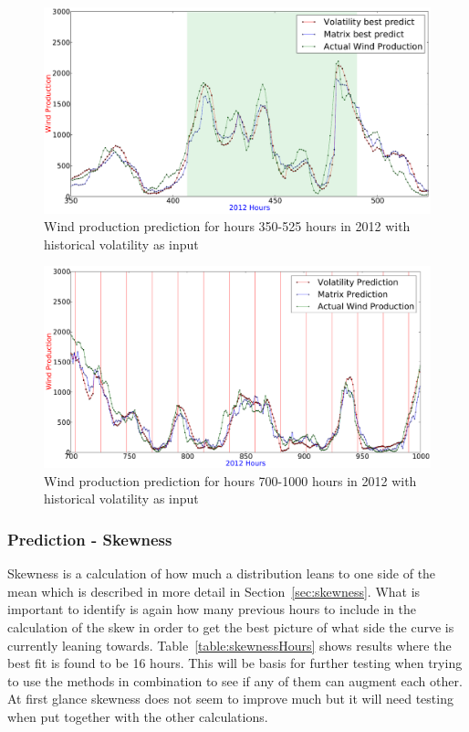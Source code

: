 \begin{figure}[H]
\centering
\includegraphics[width=0.99\linewidth]{billeder/bestVolatilityVsMatrixGraph350-525.png}
\caption{Wind production prediction for hours 350-525 hours in 2012 with historical volatility as input}
\label{fig:bestVolatilityVsMatrixGraph350-525}
\end{figure} 

\begin{figure}[H]
\centering
\includegraphics[width=0.99\linewidth]{billeder/volatilityBest700-1000.png}
\caption{Wind production prediction for hours 700-1000 hours in 2012 with historical volatility as input}
\label{fig:volatilityBest700-1000}
\end{figure} 

\subsubsection{Prediction - Skewness}
Skewness is a calculation of how much a distribution leans to one side of the mean which is described in more detail in Section~\ref{sec:skewness}. What is important to identify is again how many previous hours to include in the calculation of the skew in order to get the best picture of what side the curve is currently leaning towards. Table~\ref{table:skewnessHours} shows results where the best fit is found to be 16 hours. This will be basis for further testing when trying to use the methods in combination to see if any of them can augment each other. At first glance skewness does not seem to improve much but it will need testing when put together with the other calculations.

